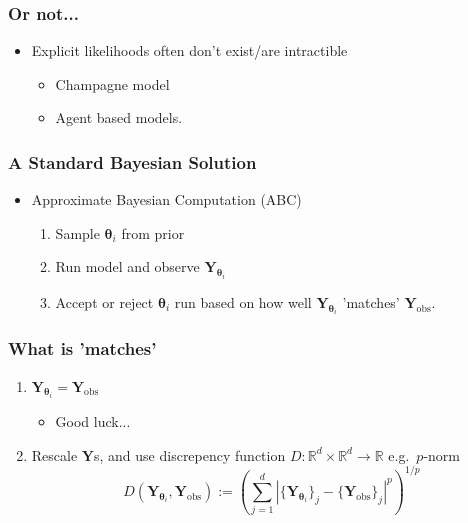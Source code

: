 \documentclass{beamer}
\newcommand{\R}{\mathbb{R}}
\begin{document}
\begin{frame}
    \frametitle{Or not...}
    \begin{itemize}
        \item Explicit likelihoods often don't exist/are intractible \begin{itemize}
                  \item Champagne model
                  \item Agent based models.
              \end{itemize}
    \end{itemize}
\end{frame}

\begin{frame}
    \frametitle{A Standard Bayesian Solution}
    \begin{itemize}
        \item Approximate Bayesian Computation (ABC)\begin{enumerate}
                  \item Sample $\bm{\theta}_i$ from prior
                  \item Run model and observe $\mathbf{Y}_{\bm{\theta}_i}$
                  \item Accept or reject $\bm{\theta}_i$ run based on how well
                        $\mathbf{Y}_{\bm{\theta}_i}$ 'matches' $\mathbf{Y}_\text{obs}.$
              \end{enumerate}
    \end{itemize}
\end{frame}

\begin{frame}
    \frametitle{What is 'matches'}
    \begin{enumerate}
        \item $\mathbf{Y}_{\bm{\theta}_i} = \mathbf{Y}_\text{obs}$
              \begin{itemize}
                  \item <2-> Good luck...
              \end{itemize}
        \item <3-> Rescale $\mathbf{Y}$s, and use discrepency function
              $D:\R^d\times\R^d\to\R$ e.g.\ $p$-norm
              $$
                  D(\mathbf{Y}_{\bm{\theta}_i}, \mathbf{Y}_\text{obs})
                  :=\left(\sum_{j = 1}^d
                  \left|\{\mathbf{Y}_{\bm{\theta}_i}\}_j
                  - \{\mathbf{Y}_\text{obs}\}_j\right|^p\right)^{1/p}
              $$
    \end{enumerate}
\end{frame}
\end{document}
